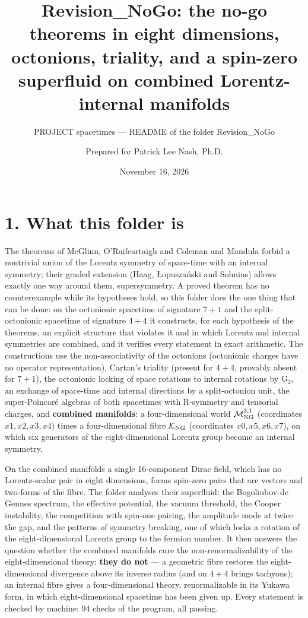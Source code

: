 \documentclass[
  10pt,
]{article}
\title{Revision\_NoGo: the no-go theorems in eight dimensions,
octonions, triality, and a spin-zero superfluid on combined
Lorentz-internal manifolds}
\subtitle{PROJECT spacetimes --- README of the folder Revision\_NoGo}
\author{Prepared for Patrick Lee Nash, Ph.D.}
\date{November 16, 2026}
\begin{document}
\maketitle

\hypertarget{what-this-folder-is}{%
\section{1. What this folder is}\label{what-this-folder-is}}

The theorems of McGlinn, O'Raifeartaigh and Coleman and Mandula forbid a
nontrivial union of the Lorentz symmetry of space-time with an internal
symmetry; their graded extension (Haag, Łopuszański and Sohnius) allows
exactly one way around them, supersymmetry. A proved theorem has no
counterexample while its hypotheses hold, so this folder does the one
thing that can be done: on the octonionic spacetime of signature \(7+1\)
and the split-octonionic spacetime of signature \(4+4\) it constructs,
for each hypothesis of the theorems, an explicit structure that violates
it and in which Lorentz and internal symmetries are combined, and it
verifies every statement in exact arithmetic. The constructions use the
non-associativity of the octonions (octonionic charges have no operator
representation), Cartan's triality (present for \(4+4\), provably absent
for \(7+1\)), the octonionic locking of space rotations to internal
rotations by \(\mathrm G_2\), an exchange of space-time and internal
directions by a split-octonion unit, the super-Poincaré algebras of both
spacetimes with R-symmetry and tensorial charges, and \textbf{combined
manifolds}: a four-dimensional world \(\mathcal M^{3,1}_{\rm NG}\)
(coordinates \(x1,x2,x3,x4\)) times a four-dimensional fibre
\(\mathcal K_{\rm NG}\) (coordinates \(x0,x5,x6,x7\)), on which six
generators of the eight-dimensional Lorentz group become an internal
symmetry.

On the combined manifolds a single 16-component Dirac field, which has
no Lorentz-scalar pair in eight dimensions, forms spin-zero pairs that
are vectors and two-forms of the fibre. The folder analyses their
superfluid: the Bogoliubov-de Gennes spectrum, the effective potential,
the vacuum threshold, the Cooper instability, the competition with
spin-one pairing, the amplitude mode at twice the gap, and the patterns
of symmetry breaking, one of which locks a rotation of the
eight-dimensional Lorentz group to the fermion number. It then answers
the question whether the combined manifolds cure the
non-renormalizability of the eight-dimensional theory: \textbf{they do
not} --- a geometric fibre restores the eight-dimensional divergence
above its inverse radius (and on \(4+4\) brings tachyons); an internal
fibre gives a four-dimensional theory, renormalizable in its Yukawa
form, in which eight-dimensional spacetime has been given up. Every
statement is checked by machine: 94 checks of the program, all passing.
\end{document}
